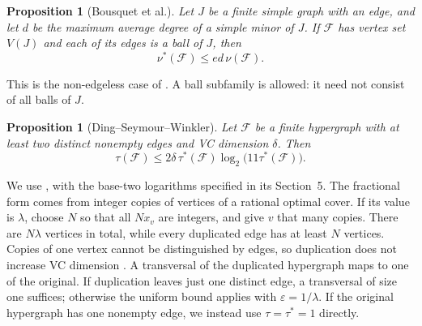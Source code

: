 \documentclass[11pt]{article}
\newtheorem{proposition}[theorem]{Proposition}
\theoremstyle{remark}
\begin{document}
\begin{proposition}[Bousquet et al.]\label{prop:packing}
Let $J$ be a finite simple graph with an edge, and let $d$ be the maximum
average degree of a simple minor of $J$. If $\mathcal F$ has vertex set
$V(J)$ and each of its edges is a ball of $J$, then
\begin{equation}\label{eq:fractional-packing}
\nu^*(\mathcal F)\le e d\,\nu(\mathcal F).
\end{equation}
\end{proposition}
This is the non-edgeless case of \cite[Theorem~4]{Bousquet}. A ball
subfamily is allowed: it need not consist of all balls of $J$.

\begin{proposition}[Ding--Seymour--Winkler]\label{prop:dsw}
Let $\mathcal F$ be a finite hypergraph with at least two distinct nonempty
edges and VC dimension $\delta$. Then
\begin{equation}\label{eq:dsw}
\tau(\mathcal F)\le
2\delta\,\tau^*(\mathcal F)\log_2\bigl(11\tau^*(\mathcal F)\bigr).
\end{equation}
\end{proposition}
We use \cite[(5.4), printed p.~10]{DSW}, with the base-two logarithms
specified in its Section~5. The fractional form comes from integer copies
of vertices of a rational optimal cover. If its value is $\lambda$, choose
$N$ so that all $Nx_v$ are integers, and give $v$ that many copies.
There are $N\lambda$ vertices in total, while every duplicated edge has
at least $N$ vertices. Copies of one vertex cannot be distinguished by
edges, so duplication does not increase VC dimension
\cite[(5.3)]{DSW}. A transversal of the duplicated hypergraph maps to one
of the original. If duplication leaves just one distinct edge, a
transversal of size one suffices; otherwise the uniform bound
\cite[(5.1)]{DSW} applies with $\varepsilon=1/\lambda$.
If the original hypergraph has one nonempty edge, we instead use
$\tau=\tau^*=1$ directly.
\end{document}
